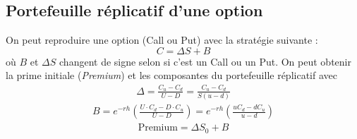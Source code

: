 \documentclass[10pt, french]{article}
\begin{document}
\begin{multicols*}{2}
\subsection*{Portefeuille réplicatif d'une option}
On peut reproduire une option (Call ou Put) avec la stratégie suivante  :
\[C = \Delta S + B\]
où $B$ et $\Delta S$ changent de signe selon si c'est un Call ou un Put. On peut obtenir la prime initiale (\textit{Premium}) et les composantes du portefeuille réplicatif avec
\begin{align*}
\Delta = \frac{C_u - C_d}{U - D} =  \frac{C_u - C_d}{S(u -d)}
\end{align*}
\begin{align*}
B = e^{-rh} \left( \frac{U \cdot C_d - D \cdot C_u}{U - D} \right) = e^{-rh} \left( \frac{u C_d - d C_u}{u-d} \right)
\end{align*}
\begin{align*}
\text{Premium} = \Delta S_0 + B
\end{align*}


\end{multicols*}

\end{document}
